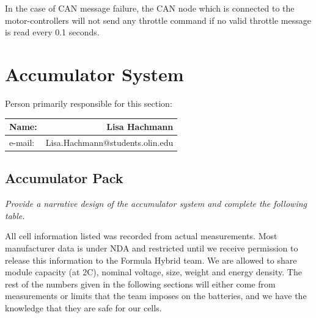 \documentclass{article}
\begin{document}
    \textnormal{In the case of CAN message failure, the CAN node which is connected to the motor-controllers will not send any throttle command if no valid throttle message is read every 0.1 seconds.}

\section{Accumulator System}

        Person primarily responsible for this section:

            \begin{table}[H]
                \centering
                \label{responsible5}
                \begin{tabular}{lr}
                Name: & Lisa Hachmann \\ \hline
                e-mail: & Lisa.Hachmann@students.olin.edu \\ \hline
                \end{tabular}
            \end{table}

    \subsection{Accumulator Pack}

        \textit{Provide a narrative design of the accumulator system and complete the following table.}

        All cell information listed was recorded from actual measurements. Most manufacturer data is under NDA and restricted until we receive permission to release this information to the Formula Hybrid team. We are allowed to share module capacity (at 2C), nominal voltage, size, weight and energy density. The rest of the numbers given in the following sections will either come from measurements or limits that the team imposes on the batteries, and we have the knowledge that they are safe for our cells.
\end{document}
